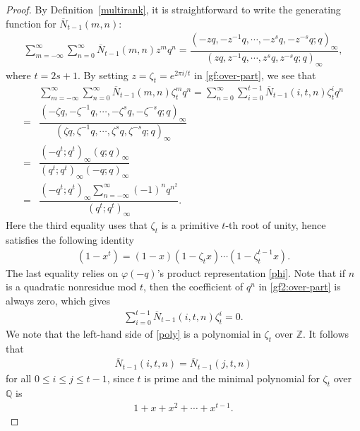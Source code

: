 \documentclass[12pt]{amsart}
\numberwithin{equation}{section}
\theoremstyle{plain}
\theoremstyle{definition}
\begin{document}
\begin{proof}
By Definition~\eqref{multirank}, it is straightforward to write the generating function for $\overline{N}_{t-1}(m,n)$:
\begin{align}\label{gf:over-part}
\sum_{m=-\infty}^{\infty}\sum_{n=0}^{\infty}\overline{N}_{t-1}(m,n)z^{m}q^{n}=
\dfrac{(-zq,-z^{-1}q,\cdots,-z^{s}q,-z^{-s}q;q)_{\infty}}{(zq,z^{-1}q,\cdots,z^{s}q,z^{-s}q;q)_{\infty}},
\end{align}
where $t=2s+1$. By setting $z=\zeta_{t}=e^{2\pi i/t}$ in \eqref{gf:over-part}, we see that
\begin{align}\label{gf2:over-part}
 &\sum_{m=-\infty}^{\infty}\sum_{n=0}^{\infty}\overline{N}_{t-1}(m,n)\zeta_{t}^{m}q^{n}=\sum_{n=0}^{\infty}\sum_{i=0}^{t-1}\overline{N}_{t-1}(i,t,n)\zeta_{t}^{i}q^{n}\\
 =&\dfrac{(-\zeta q,-\zeta^{-1}q,\cdots,-\zeta^{s}q,-\zeta^{-s}q;q)_{\infty}}{(\zeta q,\zeta^{-1}q,\cdots,\zeta^{s}q,\zeta^{-s}q;q)_{\infty}}\nonumber\\
 =&\dfrac{(-q^{t};q^{t})_{\infty}(q;q)_{\infty}}{(q^{t};q^{t})_{\infty}(-q;q)_{\infty}}\nonumber\\
 =&\dfrac{(-q^{t};q^{t})_{\infty}\sum_{n=-\infty}^{\infty}(-1)^{n}q^{n^{2}}}{(q^{t};q^{t})_{\infty}}.\nonumber
\end{align}
Here the third equality uses that $\zeta_{t}$ is a primitive $t$-th root of unity, hence satisfies the following identity
\begin{align*}
(1-x^t)=(1-x)(1-\zeta_tx)\cdots(1-\zeta_t^{t-1}x).
\end{align*}
The last equality relies on $\varphi(-q)$'s product representation \eqref{phi}. Note that if $n$ is a quadratic nonresidue mod $t$, then the coefficient of $q^{n}$ in \eqref{gf2:over-part} is always zero, which gives
\begin{align}\label{poly}
\sum_{i=0}^{t-1}\overline{N}_{t-1}(i,t,n)\zeta_{t}^{i}=0.
\end{align}
We note that the left-hand side of \eqref{poly} is a polynomial in $\zeta_{t}$ over $\mathbb{Z}$. It follows that
\begin{align*}
\overline{N}_{t-1}(i,t,n)=\overline{N}_{t-1}(j,t,n)
\end{align*}
for all $0\leq i\leq j\leq t-1$, since $t$ is prime and the minimal polynomial for $\zeta_{t}$  over $\mathbb{Q}$ is
\begin{align*}
1+x+x^{2}+\cdots+x^{t-1}.
\end{align*}

\end{proof}
\end{document}
